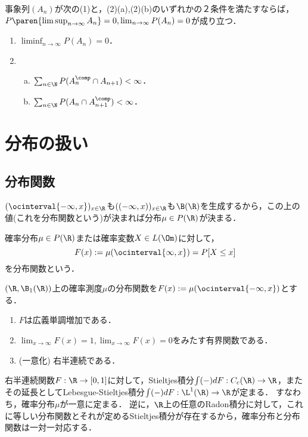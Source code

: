 \documentclass[uplatex,dvipdfmx]{jsreport}
\begin{document}
\begin{corollary}
    事象列$(A_n)$が次の(1)と，(2)(a),(2)(b)のいずれかの２条件を満たすならば，$P\paren{\limsup_{n\to\infty}A_n}=0,\lim_{n\to\infty}P(A_n)=0$が成り立つ．
    \begin{enumerate}
        \item $\liminf_{n\to\infty}P(A_n)=0$．
        \item \begin{enumerate}[(a)]
            \item $\sum_{n\in\N}P(A^\comp_n\cap A_{n+1})<\infty$．
            \item $\sum_{n\in\N}P(A_n\cap A^\comp_{n+1})<\infty$．
        \end{enumerate}
    \end{enumerate}
\end{corollary}

\section{分布の扱い}

\subsection{分布関数}

\begin{tcolorbox}[colframe=ForestGreen, colback=ForestGreen!10!white,breakable,colbacktitle=ForestGreen!40!white,coltitle=black,fonttitle=\bfseries\sffamily,
title=]
    $(\ocinterval{-\infty,x})_{x\in\R}$も$((-\infty,x))_{x\in\R}$も$\B(\R)$を生成するから，この上の値(これを分布関数という)が決まれば分布$\mu\in P(\R)$が決まる．

\end{tcolorbox}

\begin{definition}\label{def-distribution-function}
    確率分布$\mu\in P(\R)$または確率変数$X\in L(\Om)$に対して，
    \[F(x):=\mu(\ocinterval{\infty,x})=P[X\le x]\]
    を分布関数という．
\end{definition}

\begin{lemma}[分布関数の特徴付け]
    $(\R,\B_1(\R))$上の確率測度$\mu$の分布関数を$F(x):=\mu(\ocinterval{-\infty,x})$とする．
    \begin{enumerate}
        \item $F$は広義単調増加である．
        \item $\lim_{x\to\infty}F(x)=1,\lim_{x\to\infty}F(x)=0$をみたす有界関数である．
        \item (一意化) 右半連続である．
    \end{enumerate}
\end{lemma}
\begin{remarks}
    右半連続関数$F:\R\to[0,1]$に対して，Stieltjes積分$\int(-)dF:C_c(\R)\to\R$，またその延長としてLebesgue-Stieltjes積分$\int(-)dF:\L^1(\R)\to\R$が定まる．
    すなわち，確率分布$\mu$が一意に定まる．
    逆に，$\R$上の任意のRadon積分に対して，これに等しい分布関数とそれが定めるStieltjes積分が存在するから，確率分布と分布関数は一対一対応する．
\end{remarks}
\end{document}
